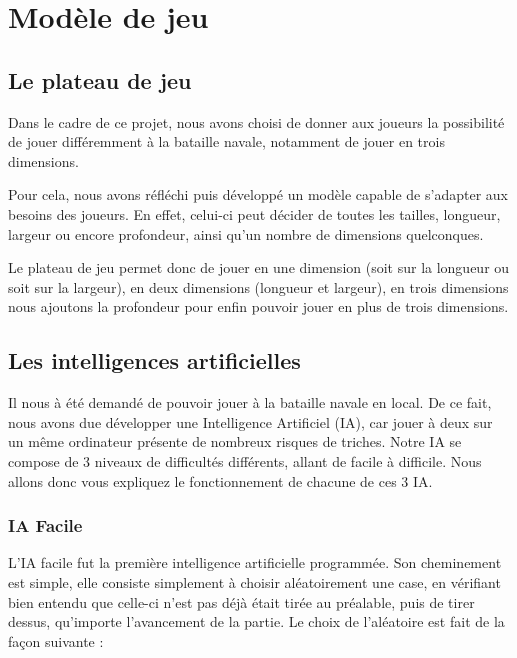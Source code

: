 \section{Modèle de jeu}

\subsection{Le plateau de jeu}

	Dans le cadre de ce projet, nous avons choisi de donner aux joueurs la possibilité de jouer différemment à la bataille navale, notamment de jouer en trois dimensions.\newline
	
	Pour cela, nous avons réfléchi puis développé un modèle capable de s'adapter aux besoins des joueurs. En effet, celui-ci peut décider de toutes les tailles, longueur, largeur ou encore profondeur, ainsi qu'un nombre de dimensions quelconques. \newline
	
	Le plateau de jeu permet donc de jouer en une dimension (soit sur la longueur ou soit sur la largeur), en deux dimensions (longueur et largeur), en trois dimensions nous ajoutons la profondeur pour enfin pouvoir jouer en plus de trois dimensions.\newline

\subsection{Les intelligences artificielles}
	Il nous à été demandé de pouvoir jouer à la bataille navale en local. 
De ce fait, nous avons due développer une Intelligence Artificiel (IA), car jouer à deux sur un même ordinateur présente de nombreux risques de triches.\newline
	Notre IA se compose de 3 niveaux de difficultés différents, allant de facile à difficile.\newline
	Nous allons donc vous expliquez le fonctionnement de chacune de ces 3 IA.\newline

\subsubsection{IA Facile}
    L'IA facile fut la première intelligence artificielle programmée. Son cheminement est simple, elle consiste simplement à choisir aléatoirement une case, en vérifiant bien entendu que celle-ci n'est pas déjà était tirée au préalable, puis de tirer dessus, qu'importe l'avancement de la partie.\newline
    Le choix de l'aléatoire est fait de la façon suivante :\newline
    
